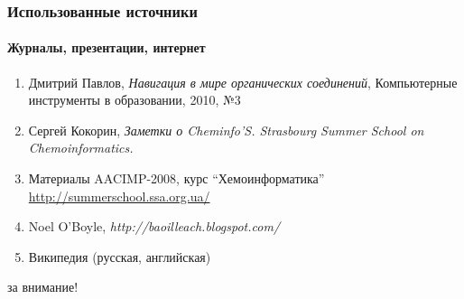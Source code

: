 \begin{frame}
  \frametitle{Использованные источники}
  \framesubtitle{Журналы, презентации, интернет}
  \begin{enumerate}
    \item Дмитрий Павлов, \emph{Навигация в мире органических соединений}, Компьютерные инструменты в образовании, 2010, №3 
    \item Сергей Кокорин, \emph{Заметки о Cheminfo'S. Strasbourg Summer School on Chemoinformatics.} 
    \item Материалы AACIMP-2008, курс ``Хемоинформатика'' \\ 
	       \url{http://summerschool.ssa.org.ua/}
    \item Noel O'Boyle, \emph{http://baoilleach.blogspot.com/}
    \item Википедия (русская, английская)
   \end{enumerate}

\end{frame}

\begin{frame}
   \begin{center}
    за внимание!
   \end{center}
\end{frame}




